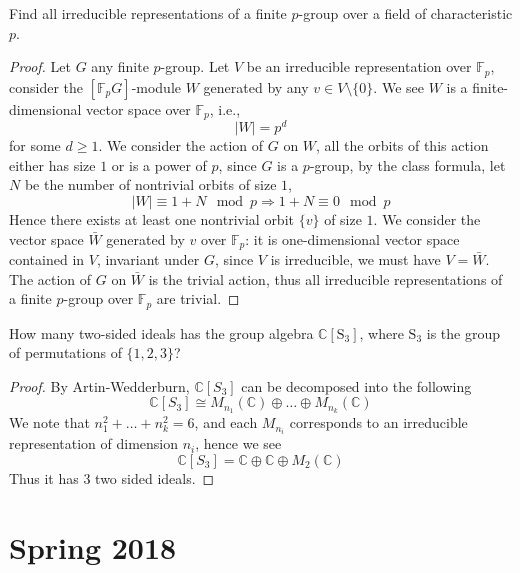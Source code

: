 \documentclass[openany]{book}
\newcommand{\C}{\mathbb{C}}
\newcommand{\F}{\mathbb{F}}
\begin{document}
\begin{prob}
    Find all irreducible representations of a finite \(p\)-group over a field of characteristic \(p\).
\end{prob}
\begin{proof}
    Let $G$ any finite $p$-group. Let $V$ be an irreducible representation over $\F_p$, consider the $[\F_pG]$-module $W$ generated by any $v\in V\setminus\{0\}$. We see $W$ is a finite-dimensional vector space over $\F_p$, i.e., 
    \begin{equation*}
        |W|=p^d
    \end{equation*}
    for some $d\geq 1$. We consider the action of $G$ on $W$, all the orbits of this action either has size $1$ or is a power of $p$, since $G$ is a $p$-group, by the class formula, let $N$ be the number of nontrivial orbits of size $1$, 
    \begin{equation*}
        |W|\equiv 1+N\mod p\Rightarrow 1+N\equiv 0\mod p
    \end{equation*}
    Hence there exists at least one nontrivial orbit $\{v\}$ of size $1$. We consider the vector space $\bar{W}$ generated by $v$ over $\F_p$: it is one-dimensional vector space contained in $V$, invariant under $G$, since $V$ is irreducible, we must have $V=\bar{W}$. The action of $G$ on $\bar{W}$ is the trivial action, thus all irreducible representations of a finite $p$-group over $\F_p$ are trivial.
\end{proof}


\begin{prob}
    How many two-sided ideals has the group algebra \(\mathbb{C}[\mathrm{S}_{3}]\), where \(\mathrm{S}_{3}\) is the group of permutations of \(\{1,2,3\}\)?
\end{prob}
\begin{proof}
    By Artin-Wedderburn, $\C[S_3]$ can be decomposed into the following 
    \begin{equation*}
        \C[S_3]\cong M_{n_1}(\C)\oplus \dots\oplus M_{n_k}(\C)
    \end{equation*}
    We note that $n_1^2+\dots+n_k^2=6$, and each $M_{n_i}$ corresponds to an irreducible representation of dimension $n_i$, hence we see 
    \begin{equation*}
        \C[S_3]=\C\oplus\C\oplus M_2(\C)
    \end{equation*}
    Thus it has $3$ two sided ideals.
\end{proof}




\chapter{Spring 2018}
\end{document}
